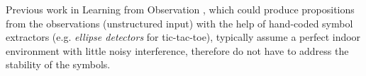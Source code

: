
Previous work in Learning from Observation \cite{BarbuNS10,Kaiser12},
which could produce propositions from the observations (unstructured input)
with the help of hand-coded symbol extractors (e.g. \emph{ellipse detectors} for tic-tac-toe),
typically assume 
a perfect indoor environment with little noisy interference,
therefore do not have to address the stability of the symbols.






